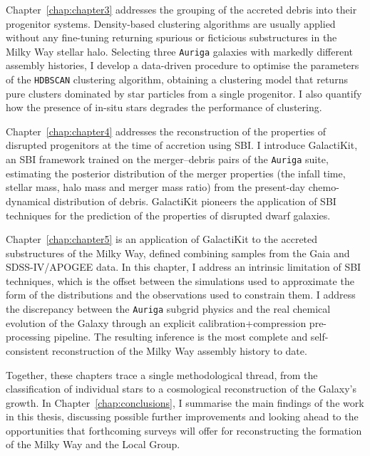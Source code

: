 Chapter~\ref{chap:chapter3} addresses the grouping of the accreted debris into their progenitor systems. 
Density-based clustering algorithms are usually applied without any fine-tuning returning spurious or ficticious substructures in the
Milky Way stellar halo. Selecting three \texttt{Auriga} galaxies with markedly different assembly histories, I develop a data-driven procedure 
to optimise the parameters of the \texttt{HDBSCAN} clustering algorithm, obtaining a clustering model that
returns pure clusters dominated by star particles from a single progenitor. I also quantify
how the presence of in-situ stars degrades the performance of clustering.

Chapter~\ref{chap:chapter4} addresses the reconstruction of the properties of disrupted progenitors at the time of accretion
using SBI. I introduce GalactiKit, an SBI framework trained on the merger--debris pairs of the \texttt{Auriga} suite,
estimating the posterior distribution of the merger properties (the infall time, stellar mass, halo mass and merger mass ratio) 
from the present-day chemo-dynamical distribution of debris. GalactiKit pioneers the application of SBI techniques for the prediction
of the properties of disrupted dwarf galaxies.

Chapter~\ref{chap:chapter5} is an application of GalactiKit to the accreted substructures of the Milky Way, defined
combining samples from the Gaia and SDSS-IV/APOGEE data. In this chapter, I address an intrinsic limitation of SBI techniques,
which is the offset between the simulations used to approximate the form of the distributions and the observations used to constrain them. 
I address the discrepancy between the \texttt{Auriga} subgrid physics and the real chemical evolution of the Galaxy through an explicit 
calibration+compression pre-processing pipeline. The resulting inference is the most complete and self-consistent reconstruction 
of the Milky Way assembly history to date.  

Together, these chapters trace a single methodological thread, 
from the classification of individual stars to a cosmological reconstruction of the Galaxy's growth. 
In Chapter~\ref{chap:conclusions}, I summarise the main findings of the work in this thesis, discussing possible further improvements
and looking ahead to the opportunities that forthcoming surveys will offer for reconstructing the formation of the Milky Way and the Local Group.

